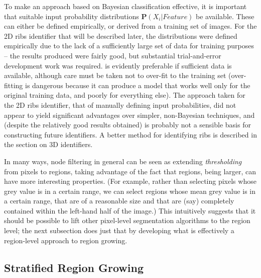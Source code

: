 To make an approach based on Bayesian classification effective, it is important that suitable input probability distributions $\mathbf{P}(X_i | \textit{Feature})$ be available. These can either be defined empirically, or derived from a training set of images. For the 2D ribs identifier that will be described later, the distributions were defined empirically  due to the lack of a sufficiently large set of data for training purposes -- the results produced were fairly good, but substantial trial-and-error development work was required.  is evidently preferable if sufficient data is available, although care must be taken not to over-fit to the training set (over-fitting is dangerous because it can produce a model that works well only for the original training data, and poorly for everything else). The approach taken for the 2D ribs identifier, that of manually defining input probabilities, did not appear to yield significant advantages over simpler, non-Bayesian techniques, and (despite the relatively good results obtained) is probably not a sensible basis for constructing future identifiers. A better method for identifying ribs is described in the section on 3D identifiers.

In many ways, node filtering in general can be seen as extending \emph{thresholding} from pixels to regions, taking advantage of the fact that regions, being larger, can have more interesting properties. (For example, rather than selecting pixels whose grey value is in a certain range, we can select regions whose mean grey value is in a certain range, that are of a reasonable size and that are (say) completely contained within the left-hand half of the image.) This intuitively suggests that it should be possible to lift other pixel-level segmentation algorithms to the region level; the next subsection does just that by developing what is effectively a region-level approach to region growing.


\subsection{Stratified Region Growing}
\label{subsec:featureid-techniques-stratifiedregiongrowing}

